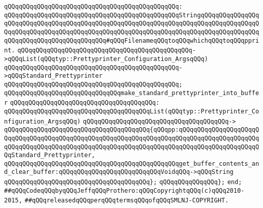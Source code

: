 \verb|qQQqqQQqqQQqqQQqqQQqqQQqqQQqqQQqqQQqqQQqqQQqqQQq:|\newline
\verb|qQQqqQQqqQQqqQQqqQQqqQQqqQQqqQQqqQQqqQQqqQQqqQQqStringqQQqqQQqqQQqqQQqqQQqqQQqqQQqqQQqqQQqqQQqqQQqqQQqqQQqqQQqqQQqqQQqqQQqqQQqqQQqqQQqqQQqqQQqqQQqqQQqqQQqqQQqqQQqqQQqqQQqqQQqqQQqqQQqqQQqqQQqqQQqqQQqqQQqqQQqqQQqqQQqqQQqqQQqqQQqqQQqqQQqqQQq#qQQqFilenameqQQqtoqQQqwhichqQQqtoqQQqpprint.|\newline
\verb|qQQqqQQqqQQqqQQqqQQqqQQqqQQqqQQqqQQqqQQqqQQqqQQq->qQQqList(qQQqtyp::Prettyprinter_Configuration_ArgsqQQq)|\newline
\verb|qQQqqQQqqQQqqQQqqQQqqQQqqQQqqQQqqQQqqQQqqQQqqQQq->qQQqStandard_Prettyprinter|\newline
\verb|qQQqqQQqqQQqqQQqqQQqqQQqqQQqqQQqqQQqqQQqqQQqqQQq;|\newline
\newline
\verb|qQQqqQQqqQQqqQQqqQQqqQQqqQQqqQQqmake_standard_prettyprinter_into_buffer|\newline
\verb|qQQqqQQqqQQqqQQqqQQqqQQqqQQqqQQqqQQqqQQq:|\newline
\verb|qQQqqQQqqQQqqQQqqQQqqQQqqQQqqQQqqQQqqQQqList(qQQqtyp::Prettyprinter_Configuration_ArgsqQQq)|\newline
\verb|qQQqqQQqqQQqqQQqqQQqqQQqqQQqqQQqqQQqqQQq->|\newline
\verb|qQQqqQQqqQQqqQQqqQQqqQQqqQQqqQQqqQQqqQQq{qQQqpp:qQQqqQQqqQQqqQQqqQQqqQQqqQQqqQQqqQQqqQQqqQQqqQQqqQQqqQQqqQQqqQQqqQQqqQQqqQQqqQQqqQQqqQQqqQQqqQQqqQQqqQQqqQQqqQQqqQQqqQQqqQQqqQQqqQQqqQQqqQQqqQQqqQQqqQQqqQQqqQQqqQQqStandard_Prettyprinter,|\newline
\verb|qQQqqQQqqQQqqQQqqQQqqQQqqQQqqQQqqQQqqQQqqQQqqQQqget_buffer_contents_and_clear_buffer:qQQqqQQqqQQqqQQqqQQqqQQqqQQqVoidqQQq->qQQqString|\newline
\verb|qQQqqQQqqQQqqQQqqQQqqQQqqQQqqQQqqQQqqQQq};|\newline
\verb|qQQqqQQqqQQqqQQq};|\newline
\verb|end;|\newline
\newline
\verb|##qQQqCodeqQQqbyqQQqJeffqQQqProthero:qQQqCopyrightqQQq(c)qQQq2010-2015,|\newline
\verb|##qQQqreleasedqQQqperqQQqtermsqQQqofqQQqSMLNJ-COPYRIGHT.|\newline

